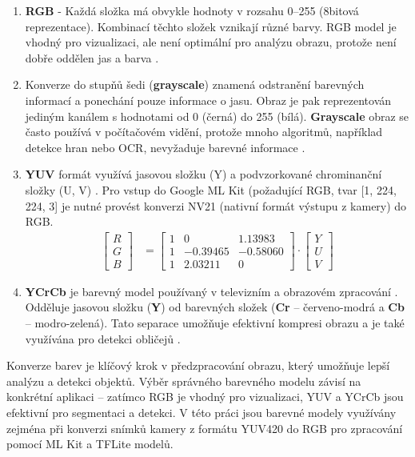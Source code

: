 \documentclass[FM,BP,CZ]{tulthesis}
\begin{document}
\begin{enumerate}
    \item \textbf{RGB} - Každá složka má obvykle hodnoty v rozsahu 0–255 (8bitová reprezentace). Kombinací těchto složek vznikají různé barvy. RGB model je vhodný pro vizualizaci, ale není optimální pro analýzu obrazu, protože není dobře oddělen jas a barva \cite{gonzalez2018digital}.
    \item Konverze do stupňů šedi (\textbf{grayscale}) znamená odstranění barevných informací a ponechání pouze informace o jasu. Obraz je pak reprezentován jediným kanálem s hodnotami od 0 (černá) do 255 (bílá). \textbf{Grayscale} obraz se často používá v počítačovém vidění, protože mnoho algoritmů, například detekce hran nebo OCR, nevyžaduje barevné informace \cite{gonzalez2018digital}.
    \item \textbf{YUV} formát využívá jasovou složku (Y) a podvzorkované chrominanční složky (U, V) \cite{gonzalez2018digital}. Pro vstup do Google ML Kit (požadující RGB, tvar [1, 224, 224, 3] je nutné provést konverzi NV21 (nativní formát výstupu z kamery) do RGB.
    \newline
\begin{align}
\begin{bmatrix}
R \\
G \\
B
\end{bmatrix}
&=
\begin{bmatrix}
1 & 0 & 1.13983 \\
1 & -0.39465 & -0.58060 \\
1 & 2.03211 & 0
\end{bmatrix}
\cdot
\begin{bmatrix}
Y \\
U \\
V
\end{bmatrix}
\end{align}


    \item \textbf{YCrCb} je barevný model používaný v televizním a obrazovém zpracování \cite{gonzalez2018digital}. Odděluje jasovou složku (\textbf{Y}) od barevných složek (\textbf{Cr} – červeno-modrá a \textbf{Cb} – modro-zelená). Tato separace umožňuje efektivní kompresi obrazu a je také využívána pro detekci obličejů \cite{wang2021survey}.
\end{enumerate}
\newpage


Konverze barev je klíčový krok v předzpracování obrazu, který umožňuje lepší analýzu a detekci objektů. Výběr správného barevného modelu závisí na konkrétní aplikaci – zatímco RGB je vhodný pro vizualizaci, YUV a YCrCb jsou efektivní pro segmentaci a detekci. V této práci jsou barevné modely využívány zejména při konverzi snímků kamery z formátu YUV420 do RGB pro zpracování pomocí ML Kit a TFLite modelů.
\end{document}
